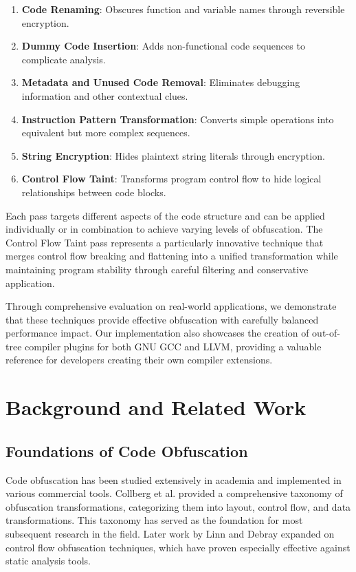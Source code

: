 \documentclass[conference]{IEEEtran}
\begin{document}
\begin{enumerate}
    \item \textbf{Code Renaming}: Obscures function and variable names through reversible encryption.
    
    \item \textbf{Dummy Code Insertion}: Adds non-functional code sequences to complicate analysis.
    
    \item \textbf{Metadata and Unused Code Removal}: Eliminates debugging information and other contextual clues.
    
    \item \textbf{Instruction Pattern Transformation}: Converts simple operations into equivalent but more complex sequences.
    
    \item \textbf{String Encryption}: Hides plaintext string literals through encryption.
    
    \item \textbf{Control Flow Taint}: Transforms program control flow to hide logical relationships between code blocks.
\end{enumerate}

Each pass targets different aspects of the code structure and can be applied individually or in combination to achieve varying levels of obfuscation. The Control Flow Taint pass represents a particularly innovative technique that merges control flow breaking and flattening into a unified transformation while maintaining program stability through careful filtering and conservative application.

Through comprehensive evaluation on real-world applications, we demonstrate that these techniques provide effective obfuscation with carefully balanced performance impact. Our implementation also showcases the creation of out-of-tree compiler plugins for both GNU GCC and LLVM, providing a valuable reference for developers creating their own compiler extensions.

\section{Background and Related Work}

\subsection{Foundations of Code Obfuscation}
Code obfuscation has been studied extensively in academia and implemented in various commercial tools. Collberg et al. \cite{collberg1997taxonomy} provided a comprehensive taxonomy of obfuscation transformations, categorizing them into layout, control flow, and data transformations. This taxonomy has served as the foundation for most subsequent research in the field. Later work by Linn and Debray \cite{linn2003obfuscation} expanded on control flow obfuscation techniques, which have proven especially effective against static analysis tools.
\end{document}
